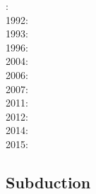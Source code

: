 : \cite{tars91}\\
1992: \cite{zaju92}\\
1993: \cite{nabr93}\\
1996: \cite{maar96}\\
2004: \cite{istt04}\\
2006: \cite{maqs07}\\
2007: \cite{huja07}\\
2011: \cite{brfo11}\\
2012: \cite{fejr12}\\
2014: \cite{bakp14}\cite{feka14a}\cite{feka14b}\\
2015: \cite{feka15}

\subsection*{Subduction}

